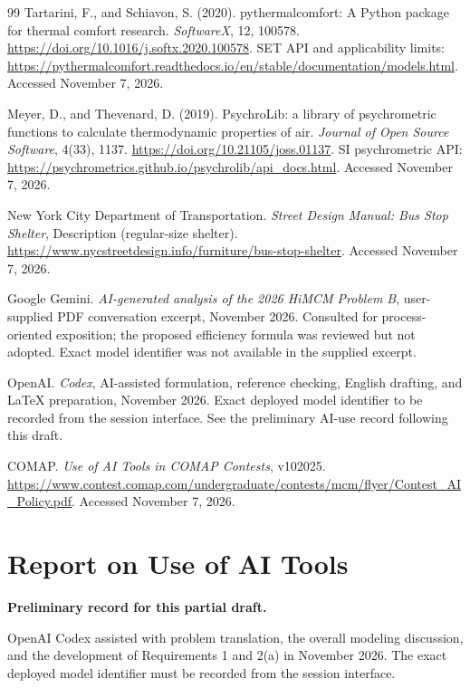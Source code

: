\documentclass[12pt]{article}
\begin{document}
\begin{thebibliography}{99}
Tartarini, F., and Schiavon, S. (2020).
pythermalcomfort: A Python package for thermal comfort research.
\emph{SoftwareX}, 12, 100578.
\url{https://doi.org/10.1016/j.softx.2020.100578}.
SET API and applicability limits:
\url{https://pythermalcomfort.readthedocs.io/en/stable/documentation/models.html}.
Accessed November 7, 2026.

Meyer, D., and Thevenard, D. (2019).
PsychroLib: a library of psychrometric functions to calculate thermodynamic properties of air.
\emph{Journal of Open Source Software}, 4(33), 1137.
\url{https://doi.org/10.21105/joss.01137}.
SI psychrometric API:
\url{https://psychrometrics.github.io/psychrolib/api_docs.html}.
Accessed November 7, 2026.

New York City Department of Transportation.
\emph{Street Design Manual: Bus Stop Shelter}, Description (regular-size shelter).
\url{https://www.nycstreetdesign.info/furniture/bus-stop-shelter}.
Accessed November 7, 2026.

Google Gemini. \emph{AI-generated analysis of the 2026 HiMCM Problem B},
user-supplied PDF conversation excerpt, November 2026.
Consulted for process-oriented exposition; the proposed efficiency formula was
reviewed but not adopted. Exact model identifier was not available in the supplied excerpt.

OpenAI. \emph{Codex}, AI-assisted formulation, reference checking,
English drafting, and LaTeX preparation, November 2026.
Exact deployed model identifier to be recorded from the session interface.
See the preliminary AI-use record following this draft.

COMAP. \emph{Use of AI Tools in COMAP Contests}, v102025.
\url{https://www.contest.comap.com/undergraduate/contests/mcm/flyer/Contest_AI_Policy.pdf}.
Accessed November 7, 2026.
\end{thebibliography}

\clearpage
{}
{}
\section*{Report on Use of AI Tools}
\noindent\textbf{Preliminary record for this partial draft.}

OpenAI Codex assisted with problem translation, the overall modeling discussion,
and the development of Requirements 1 and 2(a) in November 2026. The exact deployed model
identifier must be recorded from the session interface.
\end{document}
